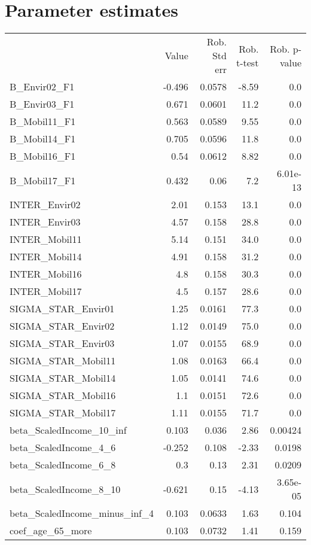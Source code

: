 \section{Parameter estimates}
\begin{tabular}{lrrrr}
 & Value & Rob. Std err & Rob. t-test & Rob. p-value \\
B_Envir02_F1 & -0.496 & 0.0578 & -8.59 & 0.0 \\
B_Envir03_F1 & 0.671 & 0.0601 & 11.2 & 0.0 \\
B_Mobil11_F1 & 0.563 & 0.0589 & 9.55 & 0.0 \\
B_Mobil14_F1 & 0.705 & 0.0596 & 11.8 & 0.0 \\
B_Mobil16_F1 & 0.54 & 0.0612 & 8.82 & 0.0 \\
B_Mobil17_F1 & 0.432 & 0.06 & 7.2 & 6.01e-13 \\
INTER_Envir02 & 2.01 & 0.153 & 13.1 & 0.0 \\
INTER_Envir03 & 4.57 & 0.158 & 28.8 & 0.0 \\
INTER_Mobil11 & 5.14 & 0.151 & 34.0 & 0.0 \\
INTER_Mobil14 & 4.91 & 0.158 & 31.2 & 0.0 \\
INTER_Mobil16 & 4.8 & 0.158 & 30.3 & 0.0 \\
INTER_Mobil17 & 4.5 & 0.157 & 28.6 & 0.0 \\
SIGMA_STAR_Envir01 & 1.25 & 0.0161 & 77.3 & 0.0 \\
SIGMA_STAR_Envir02 & 1.12 & 0.0149 & 75.0 & 0.0 \\
SIGMA_STAR_Envir03 & 1.07 & 0.0155 & 68.9 & 0.0 \\
SIGMA_STAR_Mobil11 & 1.08 & 0.0163 & 66.4 & 0.0 \\
SIGMA_STAR_Mobil14 & 1.05 & 0.0141 & 74.6 & 0.0 \\
SIGMA_STAR_Mobil16 & 1.1 & 0.0151 & 72.6 & 0.0 \\
SIGMA_STAR_Mobil17 & 1.11 & 0.0155 & 71.7 & 0.0 \\
beta_ScaledIncome_10_inf & 0.103 & 0.036 & 2.86 & 0.00424 \\
beta_ScaledIncome_4_6 & -0.252 & 0.108 & -2.33 & 0.0198 \\
beta_ScaledIncome_6_8 & 0.3 & 0.13 & 2.31 & 0.0209 \\
beta_ScaledIncome_8_10 & -0.621 & 0.15 & -4.13 & 3.65e-05 \\
beta_ScaledIncome_minus_inf_4 & 0.103 & 0.0633 & 1.63 & 0.104 \\
coef_age_65_more & 0.103 & 0.0732 & 1.41 & 0.159 \\

\end{tabular}
